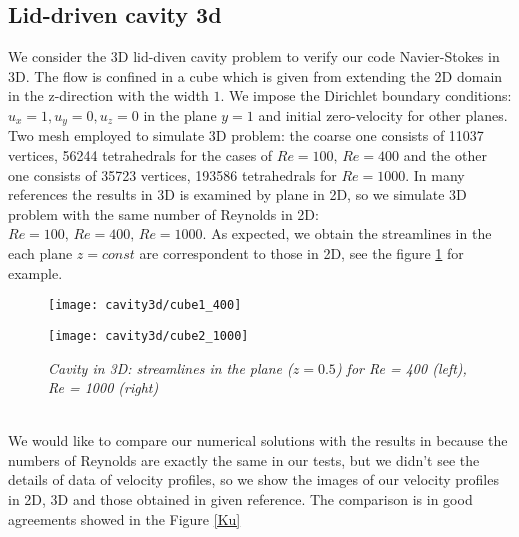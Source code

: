 \subsection{Lid-driven cavity 3d}
We consider the 3D lid-diven cavity problem to verify our code Navier-Stokes in 3D. The flow is confined in a cube which is given from extending the 2D domain in the z-direction with the width $1$. We impose the Dirichlet boundary conditions: $u_x = 1, u_y = 0, u_z = 0 $ in the plane $y=1$ and initial zero-velocity for other planes. Two mesh employed to simulate 3D problem: the coarse one consists of 11037 vertices, 56244 tetrahedrals for the cases of $Re = 100, \, Re = 400$ and the other one consists of 35723 vertices, 193586 tetrahedrals for $Re = 1000$. 
In many references the results in 3D is examined by plane in 2D, so we simulate 3D problem with the same number of Reynolds in 2D: $Re = 100,\, Re = 400, \,Re =1000$.
As expected, we obtain the streamlines in the each plane $z=const$ are correspondent to those in 2D, see the figure \ref{streamline3D} for example.
\begin{figure}[htbp]
\begin{minipage}[b]{0.5\textwidth}
\centering
\texttt{[image: cavity3d/cube1\_400]}
\end{minipage}
\hfill
\begin{minipage}[b]{0.5\textwidth}
\centering
\texttt{[image: cavity3d/cube2\_1000]}
\end{minipage}
\caption{\em Cavity in 3D: streamlines in the plane ($z=0.5$) for Re = 400 (left), Re = 1000 (right)}\label{streamline3D}
\end{figure}\\
We would like to compare our numerical solutions with the results in \cite{Ku87} because the numbers of Reynolds are exactly the same in our tests, but we didn't see the details of data of velocity profiles, so we show the images of our velocity profiles in 2D, 3D and those obtained in given reference. The comparison is in good agreements showed in the Figure \ref{Ku}
\newpage
